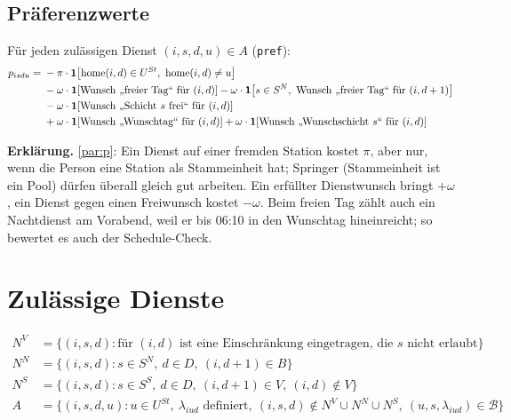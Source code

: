 \documentclass[11pt]{combiArticle}
\newcommand{\ind}[1]{\mathbf{1}\!\left[#1\right]}
\newcommand{\code}[1]{\texttt{#1}}
\begin{document}
\subsection{Präferenzwerte}

Für jeden zulässigen Dienst $(i,s,d,u) \in A$ (\code{pref}):
\begin{align}
  p_{isdu} = {} & - \pi \cdot \ind{\operatorname{home}(i,d) \in U^{St},\ \operatorname{home}(i,d) \neq u}
                 \label{par:p}\\
  & - \omega \cdot \ind{\text{Wunsch „freier Tag“ für } (i,d)}
    - \omega \cdot \ind{s \in S^{N},\ \text{Wunsch „freier Tag“ für } (i,d+1)} \notag\\
  & - \omega \cdot \ind{\text{Wunsch „Schicht } s \text{ frei“ für } (i,d)} \notag\\
  & + \omega \cdot \ind{\text{Wunsch „Wunschtag“ für } (i,d)}
    + \omega \cdot \ind{\text{Wunsch „Wunschschicht } s\text{“ für } (i,d)} \notag
\end{align}

\textbf{Erklärung.}
\eqref{par:p}: Ein Dienst auf einer fremden Station kostet $\pi$, aber nur, wenn die Person eine Station als
Stammeinheit hat; Springer (Stammeinheit ist ein Pool) dürfen überall gleich gut arbeiten. Ein erfüllter
Dienstwunsch bringt $+\omega$, ein Dienst gegen einen Freiwunsch kostet $-\omega$. Beim freien Tag zählt auch
ein Nachtdienst am Vorabend, weil er bis 06:10 in den Wunschtag hineinreicht; so bewertet es auch der
Schedule-Check.

\section{Zulässige Dienste}

\begin{align}
  N^{V} &= \{(i,s,d) : \text{für } (i,d) \text{ ist eine Einschränkung eingetragen, die } s \text{ nicht erlaubt}\} \label{eq:NV}\\
  N^{N} &= \{(i,s,d) : s \in S^{N},\ d \in D,\ (i,d+1) \in B\} \label{eq:NN}\\
  N^{S} &= \{(i,s,d) : s \in S^{S},\ d \in D,\ (i,d+1) \in V,\ (i,d) \notin V\} \label{eq:NS}\\
  A &= \bigl\{(i,s,d,u) : u \in U^{St},\ \lambda_{iud} \text{ definiert},\
       (i,s,d) \notin N^{V} \cup N^{N} \cup N^{S},\ (u,s,\lambda_{iud}) \in \mathcal{B}\bigr\} \label{eq:A}
\end{align}
\end{document}
